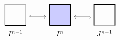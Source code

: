 \begin{center}
    \(
    \begin{tikzcd}
    \begin{tikzpicture}[x=3em, y=3em, baseline=1em]
        \draw[very thick, black!30] (0,0)--(1,0)--(1,1)--(0,1)--(0,0);
        \draw[very thick]
        (0,0)--(1,0);
        \filldraw (0.5, -0.5) node{$I^{n-1}$};
    \end{tikzpicture}
    \ar[r, hook]
    &
    \begin{tikzpicture}[x=3em, y=3em, baseline=1em]
        \filldraw[very thick, fill=blue!20] (0,0)--(1,0)--(1,1)--(0,1)--(0,0);
        \filldraw (0.5, -0.5) node{$I^{n}$};
    \end{tikzpicture}
    & 
    \begin{tikzpicture}[x=3em, y=3em, baseline=1em]
        \draw[very thick, black!30] (0,0)--(1,0)--(1,1)--(0,1)--(0,0);
        \draw[very thick] (1,0)--(1,1)--(0,1)--(0,0);   \filldraw (0.5, -0.5) node{$J^{n-1}$};
    \end{tikzpicture}
    \ar[l, hook]
    \end{tikzcd}
    \)
\end{center}